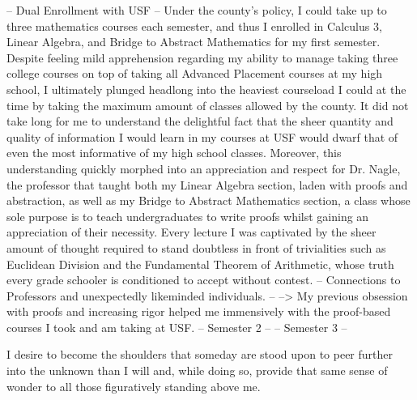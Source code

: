 \documentclass[12pt]{article}
\begin{document}
\begin{outline}[enumerate]
    \2 -- Dual Enrollment with USF -- %
      \3 Under the county's policy, I could take up to three mathematics courses each semester, and thus I enrolled in Calculus 3, Linear Algebra, and Bridge to Abstract Mathematics for my first semester. Despite feeling mild apprehension regarding my ability to manage taking three college courses on top of taking all Advanced Placement courses at my high school, I ultimately plunged headlong into the heaviest courseload I could at the time by taking the maximum amount of classes allowed by the county. It did not take long for me to understand the delightful fact that the sheer quantity and quality of information I would learn in my courses at USF would dwarf that of even the most informative of my high school classes. Moreover, this understanding quickly morphed into an appreciation and respect for Dr. Nagle, the professor that taught both my Linear Algebra section, laden with proofs and abstraction, as well as my Bridge to Abstract Mathematics section, a class whose sole purpose is to teach undergraduates to write proofs whilst gaining an appreciation of their necessity.
      Every lecture I was captivated by the sheer amount of thought required to stand doubtless in front of trivialities such as Euclidean Division and the Fundamental Theorem of Arithmetic, whose truth every grade schooler is conditioned to accept without contest.
        \4 -- Connections to Professors and unexpectedly likeminded individuals. --
      \3 --> My previous obsession with proofs and increasing rigor helped me immensively with the proof-based courses I took and am taking at USF.
      \3 -- Semester 2 --
      \3 -- Semester 3 --
\end{outline}



I desire to become the shoulders that someday are stood upon to peer further into the unknown than I will and, while doing so, provide that same sense of wonder to all those figuratively standing above me.
\end{document}
